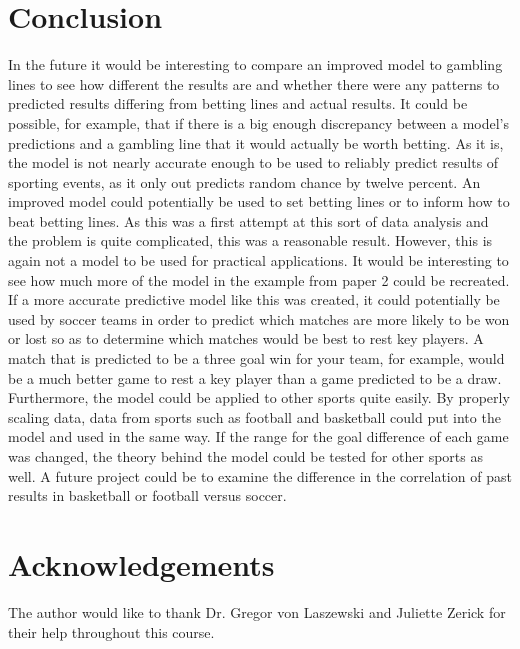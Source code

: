 \documentclass[sigconf]{acmart}
\begin{document}
\section{Conclusion}
In the future it would be interesting to compare an improved model to gambling lines to see how different the results are and whether there were any patterns to predicted results differing from betting lines and actual results. It could be possible, for example, that if there is a big enough discrepancy between a model's predictions and a gambling line that it would actually be worth betting. As it is, the model is not nearly accurate enough to be used to reliably predict results of sporting events, as it only out predicts random chance by twelve percent. An improved model could potentially be used to set betting lines or to inform how to beat betting lines. As this was a first attempt at this sort of data analysis and the problem is quite complicated, this was a reasonable result. However, this is again not a model to be used for practical applications. It would be interesting to see how much more of the model in the example from paper 2 could be recreated. If a more accurate predictive model like this was created, it could potentially be used by soccer teams in order to predict which matches are more likely to be won or lost so as to determine which matches would be best to rest key players. A match that is predicted to be a three goal win for your team, for example, would be a much better game to rest a key player than a game predicted to be a draw. Furthermore, the model could be applied to other sports quite easily. By properly scaling data, data from sports such as football and basketball could put into the model and used in the same way. If the range for the goal difference of each game was changed, the theory behind the model could be tested for other sports as well. A future project could be to examine the difference in the correlation of past results in basketball or football versus soccer.

\section{Acknowledgements}
The author would like to thank Dr. Gregor von Laszewski and Juliette Zerick for their help throughout this course.



\end{document}
